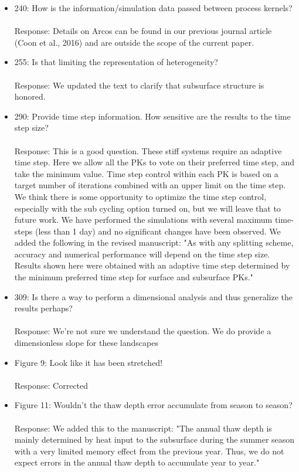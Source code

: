 \documentclass[12pt]{article}\usepackage{amsmath, amssymb, graphicx, array}
\begin{document}
\begin{itemize}
\item 240: How is the information/simulation data passed between process kernels? \\ \\
Response:  Details on Arcos can be found in our previous journal article (Coon et al., 2016) and are outside the scope of the current paper. 

\item 255: Is that limiting the representation of heterogeneity? \\ \\
Response: We updated the text to clarify that subsurface structure is honored. 

\item 290: Provide time step information. How sensitive are the results to the time step size? \\ \\
Response:  This is a good question. These stiff systems require an adaptive time step. Here we allow all the PKs to vote on their preferred time step, and take the minimum value. Time step control within each PK is based on a target number of iterations combined with an upper limit on the time step. We think there is some opportunity to optimize the time step control, especially with the sub cycling option turned on, but we will leave that to future work.  We have performed the simulations with several maximum time-steps (less than 1 day) and no significant changes have been observed.
We added the following in the revised manuscript: "As with any splitting scheme, accuracy and numerical performance will depend on the time step size. Results shown here were obtained with an adaptive time step determined by the minimum preferred time step for surface and subsurface PKs." 

\item 309: Is there a way to perform a dimensional analysis and thus generalize the results perhaps? \\ \\
Response: We're not sure we understand the question. We do provide a dimensionless slope for these landscapes

\item Figure 9: Look like it has been stretched! \\ \\
Response: Corrected

\item Figure 11: Wouldn't the thaw depth error accumulate from season to season? \\ \\
Response: We added this to the manuscript: "The annual thaw depth is mainly determined by heat input to the subsurface during the summer season with a very limited memory effect from the previous year. Thus, we do not expect errors in the annual thaw depth to accumulate year to year." 


\end{itemize}
\end{document}
